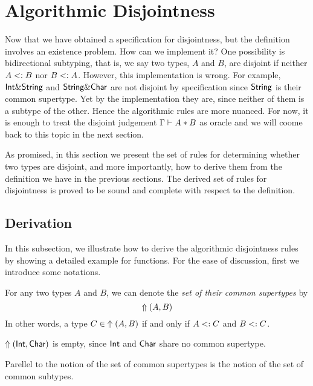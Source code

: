 \section{Algorithmic Disjointness} \label{sec:alg-dis}

Now that we have obtained a specification for disjointness, but the definition
involves an existence problem. How can we implement it? One possibility is
bidirectional subtyping, that is, we say two types, $A$ and $B$, are disjoint if
neither $A <: B$ nor $B <: A$. However, this implementation is
wrong. For example, $\textsf{Int} \& \textsf{String}$ and $\textsf{String} \& \textsf{Char}$ are
not disjoint by specification since $\textsf{String}$ is their common supertype. Yet
by the implementation they are, since neither of them is a subtype of
the other. 
Hence the algorithmic rules are more nuanced. For now, it is enough to treat the
disjoint judgement $\Gamma \vdash A * B$ as oracle and we will coome back to
this topic in the next section.

As promised, in this section we present the set of rules for determining whether
two types are disjoint, and more importantly, how to derive them from the
definition we have in the previous sections. The derived set of rules for
disjointness is proved to be sound and complete with respect to the definition.

\subsection{Derivation}

In this subsection, we illustrate how to derive the algorithmic disjointness
rules by showing a detailed example for functions. For the ease of discussion,
first we introduce some notations.

\begin{definition}
  For any two types $A$ and $B$, we can denote the \emph{set of their common
  supertypes} by \[ \Uparrow(A,B) \] In other words, a type $C \in \;
  \Uparrow(A,B)$ if and only  if $A <: C$ and $B <: C$.
\end{definition}

\begin{example}
  $\Uparrow(\textsf{Int},\textsf{Char})$ is empty, since $\textsf{Int}$ and $\textsf{Char}$
  share no common supertype.
\end{example}

Parellel to the notion of the set of common supertypes is the notion of the set
of common subtypes.

